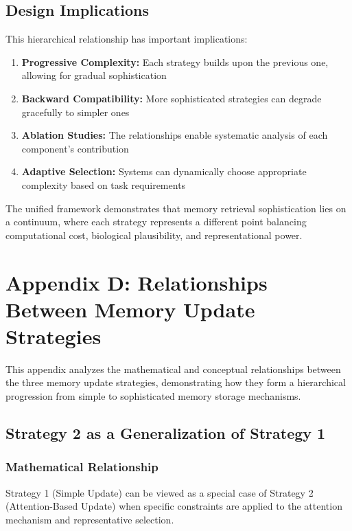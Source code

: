 \documentclass{article}
\begin{document}
\subsection{Design Implications}

This hierarchical relationship has important implications:

\begin{enumerate}
\item \textbf{Progressive Complexity:} Each strategy builds upon the previous one, allowing for gradual sophistication
\item \textbf{Backward Compatibility:} More sophisticated strategies can degrade gracefully to simpler ones
\item \textbf{Ablation Studies:} The relationships enable systematic analysis of each component's contribution
\item \textbf{Adaptive Selection:} Systems can dynamically choose appropriate complexity based on task requirements
\end{enumerate}

The unified framework demonstrates that memory retrieval sophistication lies on a continuum, where each strategy represents a different point balancing computational cost, biological plausibility, and representational power.

\section{Appendix D: Relationships Between Memory Update Strategies}

This appendix analyzes the mathematical and conceptual relationships between the three memory update strategies, demonstrating how they form a hierarchical progression from simple to sophisticated memory storage mechanisms.

\subsection{Strategy 2 as a Generalization of Strategy 1}

\subsubsection{Mathematical Relationship}

Strategy 1 (Simple Update) can be viewed as a special case of Strategy 2 (Attention-Based Update) when specific constraints are applied to the attention mechanism and representative selection.
\end{document}
